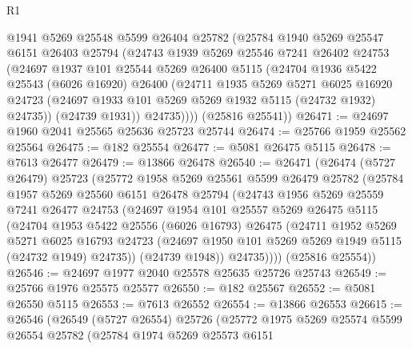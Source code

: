 \begin{lexlean}{R1}
\begin{coremodule}
        @1941
        @5269
        @25548
        @5599
        @26404
        @25782
        (@25784
          @1940
          @5269
          @25547
          @6151
          @26403
          @25794
          (@24743
            @1939
            @5269
            @25546
            @7241
            @26402
            @24753
            (@24697
              @1937
              @101
              @25544
              @5269
              @26400
              @5115
              (@24704
                @1936
                @5422
                @25543
                (@6026 @16920)
                @26400
                (@24711
                  @1935
                  @5269
                  @5271
                  @6025
                  @16920
                  @24723
                  (@24697 @1933 @101 @5269 @5269 @1932 @5115 (@24732 @1932) @24735))
                (@24739 @1931))
              @24735))))
      (@25816 @25541))
@26471 := @24697 @1960 @2041 @25565 @25636 @25723 @25744
@26474 := @25766 @1959 @25562 @25564
@26475 := @182 @25554
@26477 := @5081 @26475 @5115
@26478 := @7613 @26477
@26479 := @13866 @26478
@26540 := @26471
    (@26474
      (@5727 @26479)
      @25723
      (@25772
        @1958
        @5269
        @25561
        @5599
        @26479
        @25782
        (@25784
          @1957
          @5269
          @25560
          @6151
          @26478
          @25794
          (@24743
            @1956
            @5269
            @25559
            @7241
            @26477
            @24753
            (@24697
              @1954
              @101
              @25557
              @5269
              @26475
              @5115
              (@24704
                @1953
                @5422
                @25556
                (@6026 @16793)
                @26475
                (@24711
                  @1952
                  @5269
                  @5271
                  @6025
                  @16793
                  @24723
                  (@24697 @1950 @101 @5269 @5269 @1949 @5115 (@24732 @1949) @24735))
                (@24739 @1948))
              @24735))))
      (@25816 @25554))
@26546 := @24697 @1977 @2040 @25578 @25635 @25726 @25743
@26549 := @25766 @1976 @25575 @25577
@26550 := @182 @25567
@26552 := @5081 @26550 @5115
@26553 := @7613 @26552
@26554 := @13866 @26553
@26615 := @26546
    (@26549
      (@5727 @26554)
      @25726
      (@25772
        @1975
        @5269
        @25574
        @5599
        @26554
        @25782
        (@25784
          @1974
          @5269
          @25573
          @6151

\end{coremodule}
\end{lexlean}
